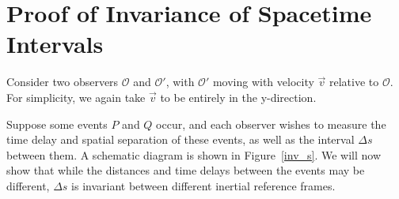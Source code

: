 \documentclass[11pt]{article}
\begin{document}
\section{Proof of Invariance of Spacetime Intervals}

Consider two observers $\mathcal{O}$ and $\mathcal{O'}$, with $\mathcal{O'}$ moving with velocity $\vec{v}$ relative to $\mathcal{O}$. For simplicity, we again take $\vec{v}$ to be entirely in the y-direction.

Suppose some events $P$ and $Q$ occur, and each observer wishes to measure the time delay and spatial separation of these events, as well as the interval $\Delta s$ between them. A schematic diagram is shown in Figure~\ref{inv_s}. We will now show that while the distances and time delays between the events may be different, $\Delta s$ is invariant between different inertial reference frames.
\end{document}
